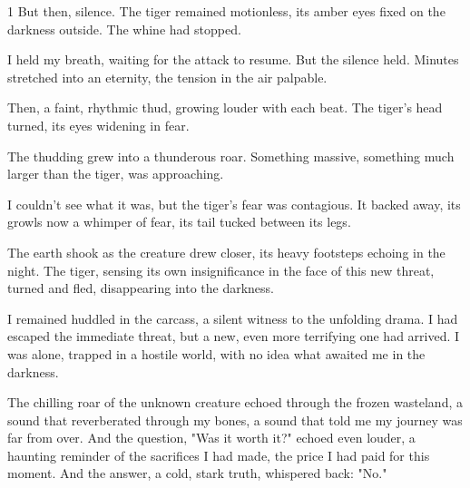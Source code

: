 \documentclass{article}
\newcommand{\baselinezs}{{\sc E2E$_{ZS}$}}
\begin{document}
\begin{tcolorbox}[colback=white, colframe=gray!30!white, coltitle=black, parskip=5mm, title=
    \textbf{System output: \baselinezs}, breakable]
\begin{spacing}{1}
But then, silence. The tiger remained motionless, its amber eyes fixed on the darkness outside. The whine had stopped.\\\par

I held my breath, waiting for the attack to resume. But the silence held. Minutes stretched into an eternity, the tension in the air palpable. \\\par

Then, a faint, rhythmic thud, growing louder with each beat. The tiger’s head turned, its eyes widening in fear.\\\par

The thudding grew into a thunderous roar. Something massive, something much larger than the tiger, was approaching.\\\par

I couldn't see what it was, but the tiger's fear was contagious. It backed away, its growls now a whimper of fear, its tail tucked between its legs.\\\par

The earth shook as the creature drew closer, its heavy footsteps echoing in the night. The tiger, sensing its own insignificance in the face of this new threat, turned and fled, disappearing into the darkness.\\\par

I remained huddled in the carcass, a silent witness to the unfolding drama. I had escaped the immediate threat, but a new, even more terrifying one had arrived. I was alone, trapped in a hostile world, with no idea what awaited me in the darkness.\\\par

The chilling roar of the unknown creature echoed through the frozen wasteland, a sound that reverberated through my bones, a sound that told me my journey was far from over. And the question, "Was it worth it?" echoed even louder, a haunting reminder of the sacrifices I had made, the price I had paid for this moment. And the answer, a cold, stark truth, whispered back: "No." 

\end{spacing}

	\end{tcolorbox}
	
\end{document}
